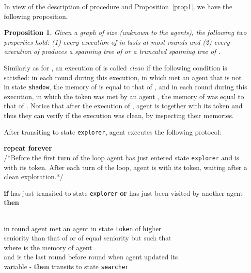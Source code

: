 \documentclass[11pt]{article}
\newtheorem{proposition}{Proposition}[section]
\begin{document}
{In view of the description of procedure  and Proposition~\ref{prop1}, we have the following proposition.}

{
\begin{proposition}
\label{prop2}
Given a graph  of size  (unknown to the agents), the following two properties hold: (1) every execution of  in  lasts at most  rounds and (2) every execution of  produces a spanning tree of  or a truncated spanning tree of .
\end{proposition}}
   


Similarly as for ,  an execution of   is called {\em clean} if 
the following condition is satisfied: in each round  during this execution, in which  met an agent  {that is not in state {\tt shadow}}, the memory of  is equal to that of ,
and in each round during this execution, in which the token  was met by an agent , the memory of  was equal to that of . Notice that 
after the execution of  , agent  is together with its token  and thus they can verify if the execution was clean, by inspecting their memories.


 After transiting to state {\tt explorer}, agent  executes the following protocol:
 
\noindent
 {\bf repeat forever}\\ 
 /*Before the first turn of the loop agent  has just entered state {\tt explorer} and is with its token.
 After each turn of the loop, agent  is with its token, waiting  after a clean exploration.*/ 
 
  \vspace*{0.2cm} 
  \noindent
  \hspace*{0.5cm} {\bf if}  has just transited to state {\tt explorer} {\bf or}  has just been visited by another agent {\bf then}\\
   \noindent
  \hspace*{1cm}{\bf do}\\
   \noindent
 \hspace*{1.5cm}
 
  \vspace*{0.2cm}
  \noindent
  \hspace*{1.5cm}{\bf if} {in round } agent  met an agent  in state {\tt token} of higher\\ 
   \noindent
  \hspace*{1.5cm}seniority than that of  or of equal seniority but 
   such that\\
   \noindent
   \hspace*{1.5cm} where  is the memory of agent \\
    \noindent
    \hspace*{1.5cm}and  is the last
   round before round  when agent  updated its \\
    \noindent
    \hspace*{1.5cm}variable - {\bf then}  transits to state {\tt searcher}
    
\end{document}
